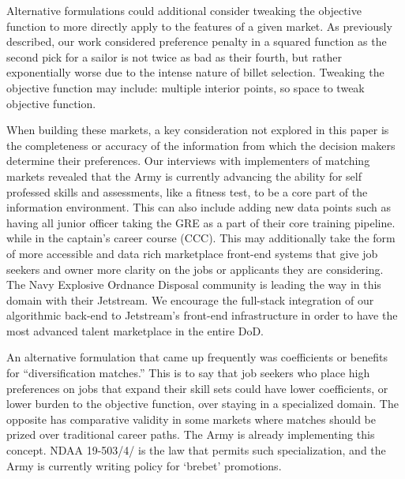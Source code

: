Alternative formulations could additional consider tweaking the objective function to more directly apply to the features of a given market. As previously described, our work considered preference penalty in a squared function as the second pick for a sailor is not twice as bad as their fourth, but rather exponentially worse due to the intense nature of billet selection. Tweaking the objective function may include: multiple interior points, so space to tweak objective function.  \cite{1988_Roth_Sotomayor}

When building these markets, a key consideration not explored in this paper is the completeness or accuracy of the information from which the decision makers determine their preferences. Our interviews with implementers of matching markets revealed that the Army is currently advancing the ability for self professed skills and assessments, like a fitness test, to be a core part of the information environment. This can also include adding new data points such as having all junior officer taking the GRE as a part of their core training pipeline. while in the captain’s career course (CCC). This may additionally take the form of more accessible and data rich marketplace front-end systems that give job seekers and owner more clarity on the jobs or applicants they are considering. The Navy Explosive Ordnance Disposal community is leading the way in this domain with their Jetstream. We encourage the full-stack integration of our algorithmic back-end to Jetstream’s front-end infrastructure in order to have the most advanced talent marketplace in the entire DoD. 

An alternative formulation that came up frequently was coefficients or benefits for “diversification matches.” This is to say that job seekers who place high preferences on jobs that expand their skill sets could have lower coefficients, or lower burden to the objective function, over staying in a specialized domain. The opposite has comparative validity in some markets where matches should be prized over traditional career paths. The Army is already implementing this concept. NDAA 19-503/4/ is the law that permits such specialization, and the Army is currently writing policy for ‘brebet’ promotions. 
